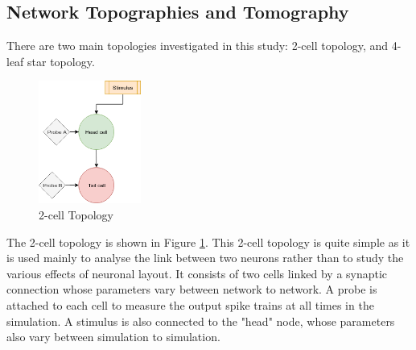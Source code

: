 \subsection{Network Topographies and Tomography}
There are two main topologies investigated in this study: 2-cell topology, and 4-leaf star topology.
\par
\begin{figure}
    \begin{center}
        \includegraphics[width=0.3\textwidth]{04-Methodology/2cellTop.png}
    \end{center}
    \caption{2-cell Topology}
    \label{fig:2cellTop}
\end{figure}
The 2-cell topology is shown in Figure \ref{fig:2cellTop}. This 2-cell topology is quite simple as it is used mainly to analyse the link between two neurons rather than to study the various effects of neuronal layout. It consists of two cells linked by a synaptic connection whose parameters vary between network to network. A probe is attached to each cell to measure the output spike trains at all times in the simulation. A stimulus is also connected to the "head" node, whose parameters also vary between simulation to simulation.

\par


